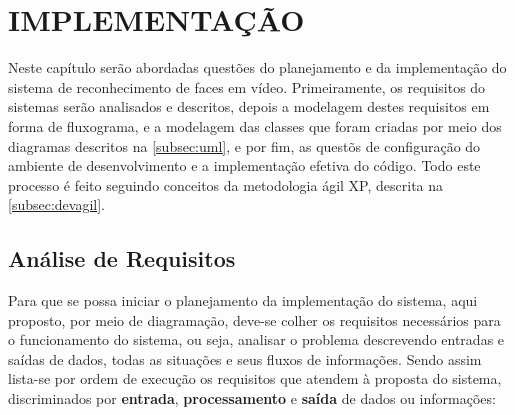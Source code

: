 
\chapter{IMPLEMENTAÇÃO}\label{ch:implementacao}

Neste capítulo serão abordadas questões do planejamento e da implementação do sistema de reconhecimento de faces em vídeo. Primeiramente, os requisitos do sistemas serão analisados e descritos, depois a modelagem destes requisitos em forma de fluxograma, e a modelagem das classes que foram criadas por meio dos diagramas descritos na \autoref{subsec:uml}, e por fim, as questõs de configuração do ambiente de desenvolvimento e a implementação efetiva do código. Todo este processo é feito seguindo conceitos da metodologia ágil XP, descrita na \autoref{subsec:devagil}.

\section{Análise de Requisitos}\label{sec:analiserec}
Para que se possa iniciar o planejamento da implementação do sistema, aqui proposto, por meio de diagramação, deve-se colher os requisitos necessários para o funcionamento do sistema, ou seja, analisar o problema descrevendo entradas e saídas de dados, todas as situações e seus fluxos de informações. Sendo assim lista-se por ordem de execução os requisitos que atendem à proposta do sistema, discriminados por \textbf{entrada}, \textbf{processamento} e \textbf{saída} de dados ou informações:


